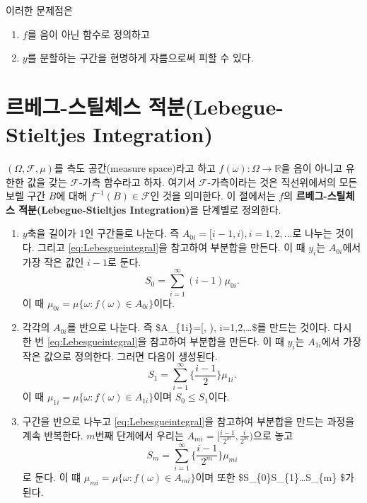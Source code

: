 \documentclass[b5paper,]{scrbook}
\theoremstyle{plain}
\theoremstyle{definition}
\numberwithin{equation}{section}
\begin{document}
이러한 문제점은

\begin{enumerate}
\def\labelenumi{\arabic{enumi}.}
\item
  \(f\)를 음이 아닌 함수로 정의하고
\item
  \(y\)를 분할하는 구간을 현명하게 자름으로써 피할 수 있다.
\end{enumerate}

\hypertarget{--lebegue-stieltjes-integration}{%
\section{르베그-스틸체스 적분(Lebegue-Stieltjes Integration)}\label{--lebegue-stieltjes-integration}}

\((\Omega, \mathcal{F}, \mu)\)를 측도 공간(measure space)라고 하고 \(f(\omega): \Omega \rightarrow \mathbb{R}\)을 음이 아니고 유한한 값을 갖는 \(\mathcal{F}\)-가측 함수라고 하자. 여기서 \(\mathcal{F}\)-가측이라는 것은 직선위에서의 모든 보렐 구간 \(B\)에 대해 \(f^{-1}(B)\in\mathcal{F}\)인 것을 의미한다. 이 절에서는 \(f\)의 \textbf{르베그-스틸체스 적분(Lebegue-Stieltjes Integration)}을 단계별로 정의한다.

\begin{enumerate}
\def\labelenumi{\arabic{enumi}.}
\item
  \(y\)축을 길이가 1인 구간들로 나눈다. 즉 \(A_{0i}=[i-1,i),i=1,2,\ldots\)로 나누는 것이다. 그리고 \eqref{eq:Lebesgueintegral}을 참고하여 부분합을 만든다. 이 때 \(y_{i}\)는 \(A_{0i}\)에서 가장 작은 값인 \(i-1\)로 둔다.
  \[S_{0} = \sum_{i=1}^{\infty}(i-1)\mu_{0i}.\]
  이 때 \(\mu_{0i}=\mu\{\omega: f(\omega) \in A_{0i} \}\)이다.
\item
  각각의 \(A_{0i}\)를 반으로 나눈다. 즉 \$A\_\{1i\}={[}, ), i=1,2,\ldots \$를 만드는 것이다. 다시 한 번 \eqref{eq:Lebesgueintegral}을 참고하여 부분합을 만든다. 이 때 \(y_{i}\)는 \(A_{1i}\)에서 가장 작은 값으로 정의한다. 그러면 다음이 생성된다.
  \[S_{1} =\sum_{i=1}^{\infty}\{\frac{i-1}{2}\}\mu_{1i}.\]
  이 때 \(\mu_{1i}=\mu\{\omega: f(\omega)\in A_{1i}\}\)이며 \(S_{0}\leq S_{1}\)이다.
\item
  구간을 반으로 나누고 \eqref{eq:Lebesgueintegral}을 참고하여 부분합을 만드는 과정을 계속 반복한다. \(m\)번째 단계에서 우리는 \(A_{mi}=[\frac{i-1}{2^{m}},\frac{i}{2^{m}})\)으로 놓고
  \[S_{m} =\sum_{i=1}^{\infty}\{\frac{i-1}{2^{m}}\}\mu_{mi}\]
  로 둔다. 이 떄 \(\mu_{mi}=\mu\{\omega: f(\omega)\in A_{mi}\}\)이며 또한 \$S\_\{0\}\leq S\_\{1\}\leq \ldots S\_\{m\} \leq \$가 된다.
\end{enumerate}
\end{document}

